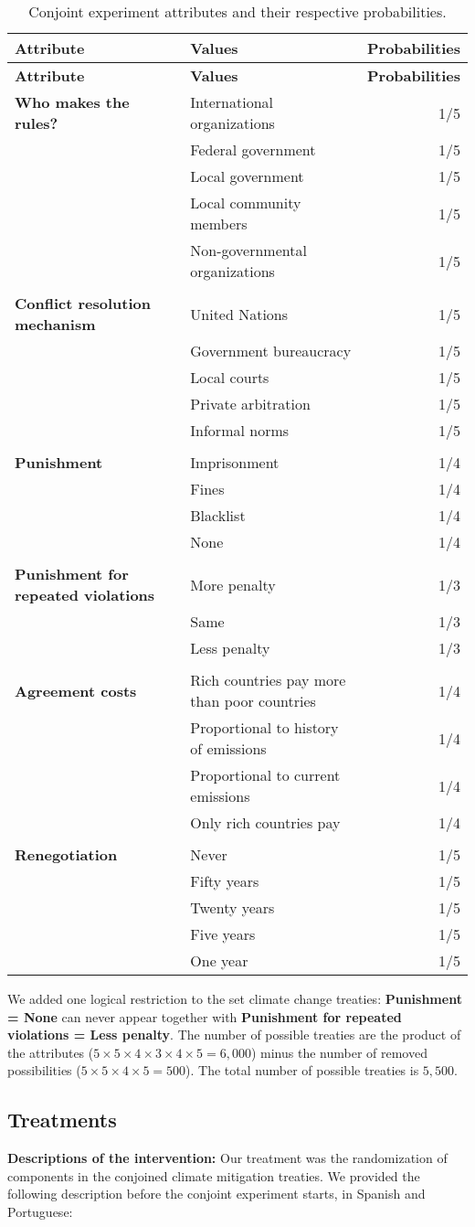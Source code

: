 \documentclass[12pt,a4paper,]{article}
\begin{document}
\begin{longtable}[]{@{}llr@{}}
\caption{Conjoint experiment attributes and their respective
probabilities.}\tabularnewline
\toprule
\textbf{Attribute} & \textbf{Values} &
\textbf{Probabilities}\tabularnewline
\midrule
\endfirsthead
\toprule
\textbf{Attribute} & \textbf{Values} &
\textbf{Probabilities}\tabularnewline
\midrule
\endhead
\textbf{Who makes the rules?} & International organizations &
1/5\tabularnewline
& Federal government & 1/5\tabularnewline
& Local government & 1/5\tabularnewline
& Local community members & 1/5\tabularnewline
& Non-governmental organizations & 1/5\tabularnewline
& &\tabularnewline
\textbf{Conflict resolution mechanism} & United Nations &
1/5\tabularnewline
& Government bureaucracy & 1/5\tabularnewline
& Local courts & 1/5\tabularnewline
& Private arbitration & 1/5\tabularnewline
& Informal norms & 1/5\tabularnewline
& &\tabularnewline
\textbf{Punishment} & Imprisonment & 1/4\tabularnewline
& Fines & 1/4\tabularnewline
& Blacklist & 1/4\tabularnewline
& None & 1/4\tabularnewline
& &\tabularnewline
\textbf{Punishment for repeated violations} & More penalty &
1/3\tabularnewline
& Same & 1/3\tabularnewline
& Less penalty & 1/3\tabularnewline
& &\tabularnewline
\textbf{Agreement costs} & Rich countries pay more than poor countries &
1/4\tabularnewline
& Proportional to history of emissions & 1/4\tabularnewline
& Proportional to current emissions & 1/4\tabularnewline
& Only rich countries pay & 1/4\tabularnewline
& &\tabularnewline
\textbf{Renegotiation} & Never & 1/5\tabularnewline
& Fifty years & 1/5\tabularnewline
& Twenty years & 1/5\tabularnewline
& Five years & 1/5\tabularnewline
& One year & 1/5\tabularnewline
\bottomrule
\end{longtable}

We added one logical restriction to the set climate change treaties:
\textbf{Punishment = None} can never appear together with
\textbf{Punishment for repeated violations = Less penalty}. The number
of possible treaties are the product of the attributes
(\(5\times 5 \times 4 \times 3 \times 4 \times 5 = 6,000\)) minus the
number of removed possibilities (\(5\times 5 \times 4 \times 5 = 500\)).
The total number of possible treaties is \(5,500\).

\hypertarget{treatments}{%
\subsection{Treatments}\label{treatments}}

\textbf{Descriptions of the intervention:} Our treatment was the
randomization of components in the conjoined climate mitigation
treaties. We provided the following description before the conjoint
experiment starts, in Spanish and Portuguese:
\end{document}

